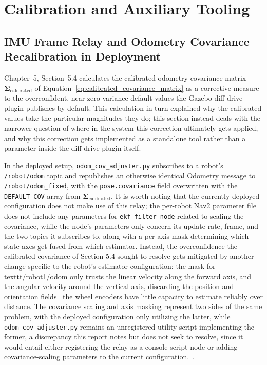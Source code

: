 \section{Calibration and Auxiliary Tooling}

\subsection{IMU Frame Relay and Odometry Covariance Recalibration in Deployment}

Chapter~5, Section~5.4 calculates the calibrated odometry covariance matrix $\boldsymbol{\Sigma}_{\text{calibrated}}$ of Equation~\eqref{eq:calibrated_covariance_matrix} as a corrective measure to the overconfident, near-zero variance default values the Gazebo diff-drive plugin publishes by default. This calculation in turn explained why the calibrated values take the particular magnitudes they do; this section instead deals with the narrower question of where in the system this correction ultimately gets applied, and why this correction gets implemented as a standalone tool rather than a parameter inside the diff-drive plugin itself.

In the deployed setup, \texttt{odom\_cov\_adjuster.py} subscribes to a robot's \texttt{/{robot}/odom} topic and republishes an otherwise identical Odometry message to \texttt{/{robot}/odom\_fixed}, with the \texttt{pose.covariance} field overwritten with the \texttt{DEFAULT\_COV} array from $\boldsymbol{\Sigma}_{\text{calibrated}}$. It is worth noting that the currently deployed configuration does not make use of this relay; the per-robot Nav2 parameter file does not include any parameters for \texttt{ekf\_filter\_node} related to scaling the covariance, while the node's parameters only concern its update rate, frame, and the two topics it subscribes to, along with a per-axis mask determining which state axes get fused from which estimator. Instead, the overconfidence the calibrated covariance of Section 5.4 sought to resolve gets mitigated by another change specific to the robot's estimator configuration: the mask for texttt{/robot1/odom} only trusts the linear velocity along the forward axis, and the angular velocity around the vertical axis, discarding the position and orientation fields~\cite{tripathi2023sensor} the wheel encoders have little capacity to estimate reliably over distance. The covariance scaling and axis masking represent two sides of the same problem, with the deployed configuration only utilizing the latter, while \texttt{odom\_cov\_adjuster.py} remains an unregistered utility script implementing the former, a discrepancy this report notes but does not seek to resolve, since it would entail either registering the relay as a console-script node or adding covariance-scaling parameters to the current configuration.~\cite{tripathi2023sensor}.

